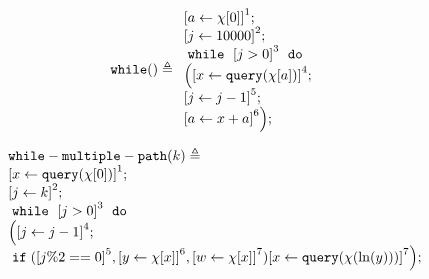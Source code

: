             \begin{example}
                \[
                \kw{while}() \triangleq
                \begin{array}{l}
                    \clabel{ \assign{a}{\chi[0]}}^{1} ; \\
                    \clabel{\assign{j}{10000} }^{2} ; \\
                        \ewhile ~ \clabel{j > 0}^{3} ~ \edo ~ \\
                        \Big(
                         \clabel{\assign{x}{\query(\chi[a]) }}^{4}  ; \\
                         \clabel{\assign{j}{j-1}}^{5} ;\\
                        \clabel{a \leftarrow x + a}^{6}       \Big);
                    \end{array}
                \]
                \end{example}
%
        \begin{example}
        \[
        \begin{array}{l}
        \kw{while-multiple-path}(k) \triangleq \\
            \clabel{ \assign{x}{\query(\chi[0])}}^{1} ; \\
            \clabel{\assign{j}{k} }^{2} ; \\
                \ewhile ~ \clabel{j > 0}^{3} ~ \edo ~ \\
                \Big(
                 \clabel{\assign{j}{j-1}}^{4} ;\\
                 \eif(\clabel{j \% 2 == 0}^{5}, 
                 \clabel{\assign{y}{\chi[x]}}^{6}, 
                 \clabel{\assign{w}{\chi[x]}}^{7})                             
                 \clabel{\assign{x}{\query(\chi(\ln(y)))} }^{7} \Big);
            \end{array}
        \]
        \end{example}
%
